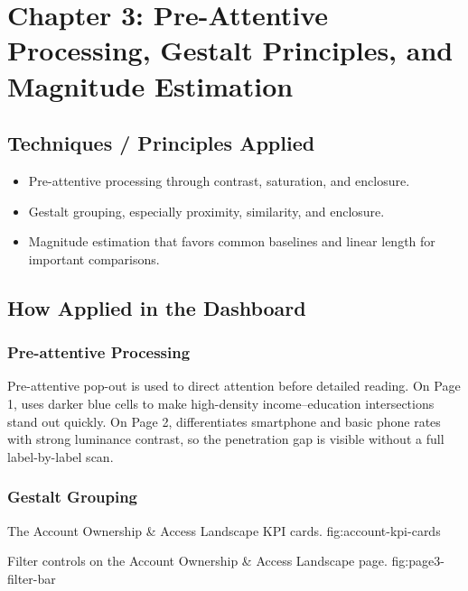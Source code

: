 \documentclass[../main.tex]{subfiles}
\begin{document}
\section{Chapter 3: Pre-Attentive Processing, Gestalt Principles, and Magnitude Estimation}
\label{sec:chapter3-preattentive-gestalt}

\subsection{Techniques / Principles Applied}

\begin{itemize}[leftmargin=*]
\item Pre-attentive processing through contrast, saturation, and enclosure.
\item Gestalt grouping, especially proximity, similarity, and enclosure.
\item Magnitude estimation that favors common baselines and linear length for
important comparisons.
\end{itemize}

\subsection{How Applied in the Dashboard}

\subsubsection{Pre-attentive Processing}

Pre-attentive pop-out is used to direct attention before detailed reading. On
Page 1,  uses darker
blue cells to make high-density income--education intersections stand out
quickly. On Page 2, 
differentiates smartphone and basic phone rates with strong luminance contrast,
so the penetration gap is visible without a full label-by-label scan.

\subsubsection{Gestalt Grouping}

{The Account Ownership \& Access Landscape KPI cards.}
{fig:account-kpi-cards}

{Filter controls on the Account Ownership \& Access Landscape page.}
{fig:page3-filter-bar}
\end{document}
